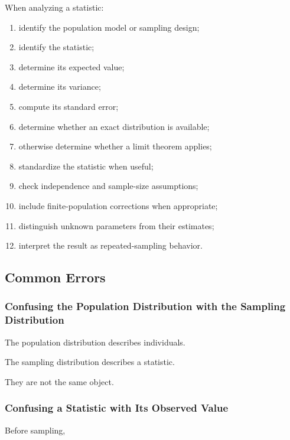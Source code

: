 When analyzing a statistic:

\begin{enumerate}
    \item identify the population model or sampling design;
    \item identify the statistic;
    \item determine its expected value;
    \item determine its variance;
    \item compute its standard error;
    \item determine whether an exact distribution is available;
    \item otherwise determine whether a limit theorem applies;
    \item standardize the statistic when useful;
    \item check independence and sample-size assumptions;
    \item include finite-population corrections when appropriate;
    \item distinguish unknown parameters from their estimates;
    \item interpret the result as repeated-sampling behavior.
\end{enumerate}

\subsection{Common Errors}
\label{subsec:sampling-distribution-common-errors}

\subsubsection{Confusing the Population Distribution with the Sampling Distribution}

The population distribution describes individuals.

The sampling distribution describes a statistic.

They are not the same object.

\subsubsection{Confusing a Statistic with Its Observed Value}

Before sampling,

